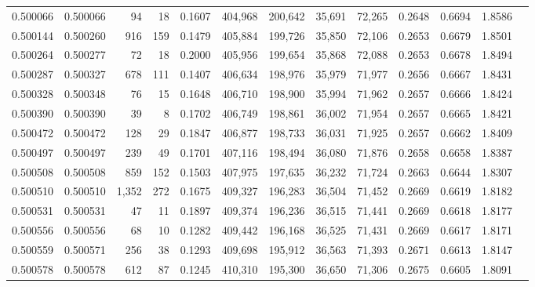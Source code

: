 \begin{tabular}{rrrrrrrrrrrrr}
0.500066 & 0.500066 &    94 &    18 &                                     0.1607 & 404,968 & 200,642 &  35,691 &  72,265 & 0.2648 & 0.6694 & 1.8586 \\
0.500144 & 0.500260 &   916 &   159 &                                     0.1479 & 405,884 & 199,726 &  35,850 &  72,106 & 0.2653 & 0.6679 & 1.8501 \\
0.500264 & 0.500277 &    72 &    18 &                                     0.2000 & 405,956 & 199,654 &  35,868 &  72,088 & 0.2653 & 0.6678 & 1.8494 \\
0.500287 & 0.500327 &   678 &   111 &                                     0.1407 & 406,634 & 198,976 &  35,979 &  71,977 & 0.2656 & 0.6667 & 1.8431 \\
0.500328 & 0.500348 &    76 &    15 &                                     0.1648 & 406,710 & 198,900 &  35,994 &  71,962 & 0.2657 & 0.6666 & 1.8424 \\
0.500390 & 0.500390 &    39 &     8 &                                     0.1702 & 406,749 & 198,861 &  36,002 &  71,954 & 0.2657 & 0.6665 & 1.8421 \\
0.500472 & 0.500472 &   128 &    29 &                                     0.1847 & 406,877 & 198,733 &  36,031 &  71,925 & 0.2657 & 0.6662 & 1.8409 \\
0.500497 & 0.500497 &   239 &    49 &                                     0.1701 & 407,116 & 198,494 &  36,080 &  71,876 & 0.2658 & 0.6658 & 1.8387 \\
0.500508 & 0.500508 &   859 &   152 &                                     0.1503 & 407,975 & 197,635 &  36,232 &  71,724 & 0.2663 & 0.6644 & 1.8307 \\
0.500510 & 0.500510 & 1,352 &   272 &                                     0.1675 & 409,327 & 196,283 &  36,504 &  71,452 & 0.2669 & 0.6619 & 1.8182 \\
0.500531 & 0.500531 &    47 &    11 &                                     0.1897 & 409,374 & 196,236 &  36,515 &  71,441 & 0.2669 & 0.6618 & 1.8177 \\
0.500556 & 0.500556 &    68 &    10 &                                     0.1282 & 409,442 & 196,168 &  36,525 &  71,431 & 0.2669 & 0.6617 & 1.8171 \\
0.500559 & 0.500571 &   256 &    38 &                                     0.1293 & 409,698 & 195,912 &  36,563 &  71,393 & 0.2671 & 0.6613 & 1.8147 \\
0.500578 & 0.500578 &   612 &    87 &                                     0.1245 & 410,310 & 195,300 &  36,650 &  71,306 & 0.2675 & 0.6605 & 1.8091 \\

\end{tabular}
